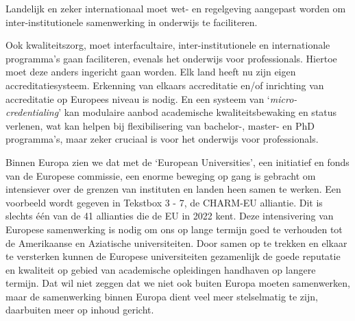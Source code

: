 \documentclass[smallauthor, chapterhaspagenum, nochapterinheader, pagenuminheader,  bigchapnum,medium2, tocpages, garamond, titleinheader]{jote-book}
\begin{document}
	Landelijk en zeker internationaal moet wet- en regelgeving aangepast worden om inter-institutionele samenwerking in onderwijs te faciliteren.



	Ook kwaliteitszorg, moet interfacultaire, inter-institutionele en internationale programma's gaan faciliteren, evenals het onderwijs voor professionals. Hiertoe moet deze anders ingericht gaan worden. Elk land heeft nu zijn eigen accreditatiesysteem. Erkenning van elkaars accreditatie en/of inrichting van accreditatie op Europees niveau is nodig. En een systeem van ‘\emph{micro-}\emph{credentialing}' kan modulaire aanbod academische kwaliteitsbewaking en status verlenen, wat kan helpen bij flexibilisering van bachelor-, master- en PhD programma's, maar zeker cruciaal is voor het onderwijs voor professionals.



	Binnen Europa zien we dat met de ‘European Universities', een initiatief en fonds van de Europese commissie, een enorme beweging op gang is gebracht om intensiever over de grenzen van instituten en landen heen samen te werken. Een voorbeeld wordt gegeven in Tekstbox 3 - 7, de CHARM-EU alliantie. Dit is slechts één van de 41 allianties die de EU in 2022 kent. Deze intensivering van Europese samenwerking is nodig om ons op lange termijn goed te verhouden tot de Amerikaanse en Aziatische universiteiten. Door samen op te trekken en elkaar te versterken kunnen de Europese universiteiten gezamenlijk de goede reputatie en kwaliteit op gebied van academische opleidingen handhaven op langere termijn. Dat wil niet zeggen dat we niet ook buiten Europa moeten samenwerken, maar de samenwerking binnen Europa dient veel meer stelselmatig te zijn, daarbuiten meer op inhoud gericht.
\end{document}
